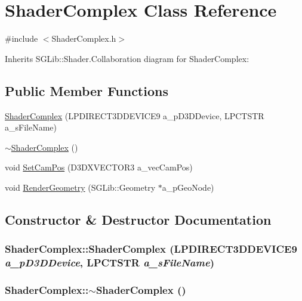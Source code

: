 \hypertarget{class_shader_complex}{
\section{ShaderComplex Class Reference}
\label{class_shader_complex}
}


{\ttfamily \#include $<$ShaderComplex.h$>$}

Inherits SGLib::Shader.Collaboration diagram for ShaderComplex:\subsection*{Public Member Functions}
\begin{DoxyCompactItemize}
\item 
\hyperlink{class_shader_complex_afba6f07a65c40f3f2622eacfc7114aae}{ShaderComplex} (LPDIRECT3DDEVICE9 a\_\-pD3DDevice, LPCTSTR a\_\-sFileName)
\item 
\hyperlink{class_shader_complex_a38d80ff68a761b0a8f2e9e0540fe423b}{$\sim$ShaderComplex} ()
\item 
void \hyperlink{class_shader_complex_acc368371245476af139ec5eb20b7353d}{SetCamPos} (D3DXVECTOR3 a\_\-vecCamPos)
\item 
void \hyperlink{class_shader_complex_aed3f29bdb3066be324b503adbcd6c120}{RenderGeometry} (SGLib::Geometry $\ast$a\_\-pGeoNode)
\end{DoxyCompactItemize}


\subsection{Constructor \& Destructor Documentation}
\hypertarget{class_shader_complex_afba6f07a65c40f3f2622eacfc7114aae}{
\subsubsection[{ShaderComplex}]{\setlength{\rightskip}{0pt plus 5cm}ShaderComplex::ShaderComplex (LPDIRECT3DDEVICE9 {\em a\_\-pD3DDevice}, \/  LPCTSTR {\em a\_\-sFileName})}}
\label{class_shader_complex_afba6f07a65c40f3f2622eacfc7114aae}
\hypertarget{class_shader_complex_a38d80ff68a761b0a8f2e9e0540fe423b}{
\subsubsection[{$\sim$ShaderComplex}]{\setlength{\rightskip}{0pt plus 5cm}ShaderComplex::$\sim$ShaderComplex ()}}
\label{class_shader_complex_a38d80ff68a761b0a8f2e9e0540fe423b}


